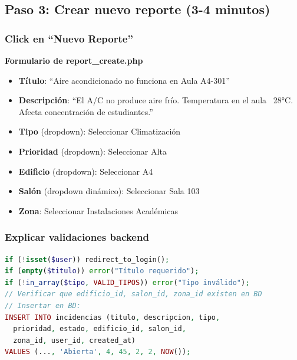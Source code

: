 \documentclass[12pt, a4paper, spanish]{article}
\begin{document}
\subsection{Paso 3: Crear nuevo reporte (3-4 minutos)}

\subsubsection{Click en ``Nuevo Reporte''}

\textbf{Formulario de report\_create.php}

\begin{tcolorbox}[colback=verde!10, colframe=verde!50, title=Campos del formulario]
\begin{itemize}
    \item[\textbf{1.}] \textbf{Título}: ``Aire acondicionado no funciona en Aula A4-301''
    \item[\textbf{2.}] \textbf{Descripción}: ``El A/C no produce aire frío. Temperatura en el aula ~28°C. Afecta concentración de estudiantes.''
    \item[\textbf{3.}] \textbf{Tipo} (dropdown): Seleccionar \textcolor{verde}{Climatización}
    \item[\textbf{4.}] \textbf{Prioridad} (dropdown): Seleccionar \textcolor{rojo}{Alta}
    \item[\textbf{5.}] \textbf{Edificio} (dropdown): Seleccionar \textcolor{azulUNAM}{A4}
    \item[\textbf{6.}] \textbf{Salón} (dropdown dinámico): Seleccionar \textcolor{azulUNAM}{Sala 103}
    \item[\textbf{7.}] \textbf{Zona}: Seleccionar \textcolor{azulUNAM}{Instalaciones Académicas}
\end{itemize}
\end{tcolorbox}

\subsubsection{Explicar validaciones backend}

\begin{lstlisting}[language=PHP, caption=Validaciones en servidor]
if (!isset($user)) redirect_to_login();
if (empty($titulo)) error("Título requerido");
if (!in_array($tipo, VALID_TIPOS)) error("Tipo inválido");
// Verificar que edificio_id, salon_id, zona_id existen en BD
// Insertar en BD:
INSERT INTO incidencias (titulo, descripcion, tipo, 
  prioridad, estado, edificio_id, salon_id, 
  zona_id, user_id, created_at)
VALUES (..., 'Abierta', 4, 45, 2, 2, NOW());
\end{lstlisting}
\end{document}
